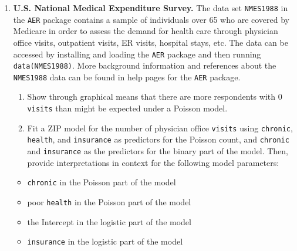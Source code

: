 \documentclass[
]{krantz}
\providecommand{\tightlist}{%
  \setlength{\itemsep}{0pt}\setlength{\parskip}{0pt}}
\begin{document}
\begin{enumerate}
\def\labelenumi{\arabic{enumi}.}
\setcounter{enumi}{5}
\item
  \textbf{U.S. National Medical Expenditure Survey.} The data set \texttt{NMES1988} in the \texttt{AER} package contains a sample of individuals over 65 who are covered by Medicare in order to assess the demand for health care through physician office visits, outpatient visits, ER visits, hospital stays, etc. The data can be accessed by installing and loading the \texttt{AER} package and then running \texttt{data(NMES1988)}. More background information and references about the \texttt{NMES1988} data can be found in help pages for the \texttt{AER} package.

  \begin{enumerate}
  \def\labelenumii{\alph{enumii}.}
  \tightlist
  \item
    Show through graphical means that there are more respondents with 0 \texttt{visits} than might be expected under a Poisson model.
  \item
    Fit a ZIP model for the number of physician office \texttt{visits} using \texttt{chronic}, \texttt{health}, and \texttt{insurance} as predictors for the Poisson count, and \texttt{chronic} and \texttt{insurance} as the predictors for the binary part of the model. Then, provide interpretations in context for the following model parameters:
  \end{enumerate}

  \begin{itemize}
  \tightlist
  \item
    \texttt{chronic} in the Poisson part of the model
  \item
    poor \texttt{health} in the Poisson part of the model
  \item
    the Intercept in the logistic part of the model
  \item
    \texttt{insurance} in the logistic part of the model
  \end{itemize}


\end{enumerate}
\end{document}
